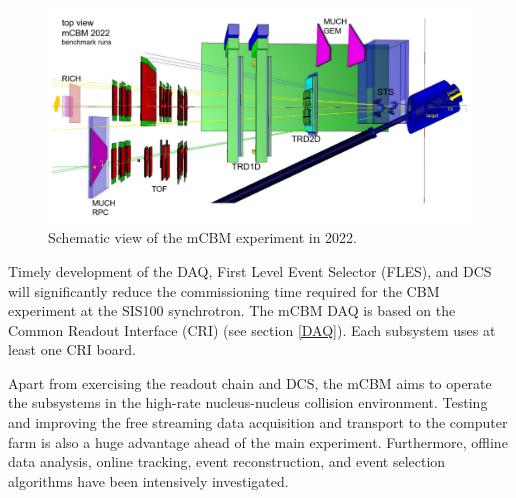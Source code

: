 \begin{figure}[!h]
\centering
\includegraphics[width=1\columnwidth]{Chapter6/DCS/images/mcbm_2021_setup.png}
\caption{Schematic view of the mCBM experiment in 2022.}
\label{fig_mcbm}
\end{figure}
\newpage
Timely development of the \gls{DAQ}, First Level Event Selector (\gls{FLES}), and \gls{DCS} will significantly reduce the commissioning time required for the \gls{CBM} experiment at the SIS100 synchrotron. The \gls{mCBM} \gls{DAQ} is based on the Common Readout Interface (\gls{CRI}) (see section \ref{DAQ}). Each subsystem uses at least one \gls{CRI} board. 

Apart from exercising the readout chain and \gls{DCS}, the \gls{mCBM} aims to operate the subsystems in the high-rate nucleus-nucleus collision environment. Testing and improving the free streaming data acquisition and transport to the computer farm is also a huge advantage ahead of the main experiment. Furthermore, offline data analysis, online tracking, event reconstruction, and event selection algorithms have been intensively investigated. 

